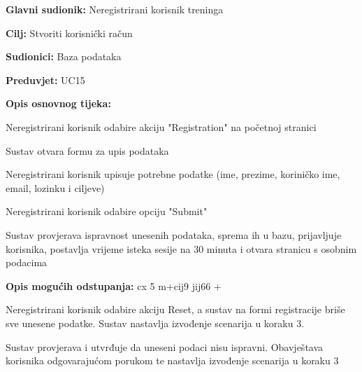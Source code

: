 					\noindent {}				\begin{packed_item}
	
						\item \textbf{Glavni sudionik: }Neregistrirani korisnik treninga
						\item  \textbf{Cilj:} Stvoriti korisnički račun
						\item  \textbf{Sudionici:} Baza podataka
						\item  \textbf{Preduvjet:} UC15
						\item  \textbf{Opis osnovnog tijeka:}
						
						 \begin{packed_enum}
                      
	                        \item Neregistrirani korisnik odabire akciju "Registration" na početnoj stranici
	                        \item Sustav otvara formu za upis podataka
							\item Neregistrirani korisnik upisuje potrebne podatke (ime, prezime, koriničko ime, email, lozinku i ciljeve)
							\item Neregistrirani korisnik odabire opciju "Submit" 
							\item Sustav provjerava ispravnost unesenih podataka, sprema ih u bazu, prijavljuje korisnika, postavlja vrijeme isteka sesije na 30 minuta i otvara stranicu s osobnim podacima
							
						
						\end{packed_enum}
						
						\item*  \textbf{Opis mogućih odstupanja:}
						cx 5 m+cij9 jij66 +
						 \begin{packed_enum}
						 	\item[4.a] Neregistrirani korisnik odabire akciju Reset, a sustav na formi registracije briše sve unesene podatke. Sustav nastavlja izvođenje scenarija u koraku 3.
							\item[5.a] Sustav provjerava i utvrđuje da uneseni podaci nisu ispravni. Obavještava korisnika odgovarajućom porukom te nastavlja izvođenje scenarija u koraku 3 
							

								
						  \end{packed_enum}
						
					\end{packed_item}
				
